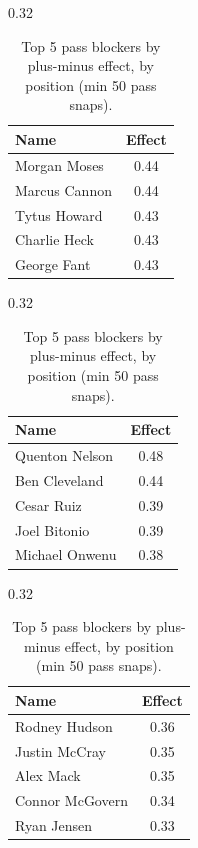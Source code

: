 \begin{table}[h!]
\centering
\begin{subtable}{0.32\textwidth}
\centering
\footnotesize
\begin{tabular}{lc}
\toprule
Name & Effect \\
\midrule
Morgan Moses & 0.44 \\
Marcus Cannon & 0.44 \\
Tytus Howard & 0.43 \\
Charlie Heck & 0.43 \\
George Fant & 0.43 \\
\bottomrule
\end{tabular}
\caption{T}
\end{subtable}
\hfill
\begin{subtable}{0.32\textwidth}
\centering
\footnotesize
\begin{tabular}{lc}
\toprule
Name & Effect \\
\midrule
Quenton Nelson & 0.48 \\
Ben Cleveland & 0.44 \\
Cesar Ruiz & 0.39 \\
Joel Bitonio & 0.39 \\
Michael Onwenu & 0.38 \\
\bottomrule
\end{tabular}
\caption{G}
\end{subtable}
\hfill
\begin{subtable}{0.32\textwidth}
\centering
\footnotesize
\begin{tabular}{lc}
\toprule
Name & Effect \\
\midrule
Rodney Hudson & 0.36 \\
Justin McCray & 0.35 \\
Alex Mack & 0.35 \\
Connor McGovern & 0.34 \\
Ryan Jensen & 0.33 \\
\bottomrule
\end{tabular}
\caption{C}
\end{subtable}
\caption{Top 5 pass blockers by plus-minus effect, by position (min 50 pass snaps).}
\label{tab:blocker_pm_top}
\end{table}

